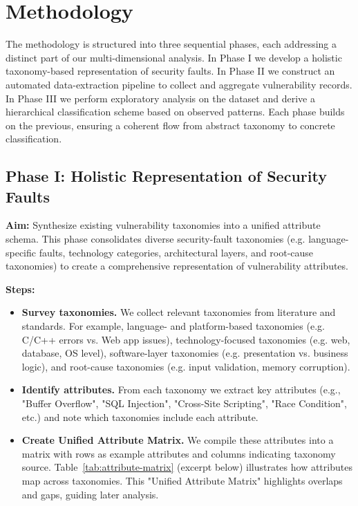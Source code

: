\section{Methodology} The methodology is structured into three sequential phases, each addressing a distinct part of our multi-dimensional analysis. In Phase I we develop a holistic taxonomy-based representation of security faults. In Phase II we construct an automated data-extraction pipeline to collect and aggregate vulnerability records. In Phase III we perform exploratory analysis on the dataset and derive a hierarchical classification scheme based on observed patterns. Each phase builds on the previous, ensuring a coherent flow from abstract taxonomy to concrete classification.

\subsection{Phase I: Holistic Representation of Security Faults} \textbf{Aim:} Synthesize existing vulnerability taxonomies into a unified attribute schema. This phase consolidates diverse security-fault taxonomies (e.g. language-specific faults, technology categories, architectural layers, and root-cause taxonomies) to create a comprehensive representation of vulnerability attributes.
\newline





\textbf{Steps:}

\begin{itemize}
    \item \textbf{Survey taxonomies.} We collect relevant taxonomies from literature and standards. For example, language- and platform-based taxonomies (e.g. C/C++ errors vs. Web app issues), technology-focused taxonomies (e.g. web, database, OS level), software-layer taxonomies (e.g. presentation vs. business logic), and root-cause taxonomies (e.g. input validation, memory corruption).
    \item \textbf{Identify attributes.} From each taxonomy we extract key attributes (e.g., "Buffer Overflow", "SQL Injection", "Cross-Site Scripting", "Race Condition", etc.) and note which taxonomies include each attribute.
    \item \textbf{Create Unified Attribute Matrix.} We compile these attributes into a matrix with rows as example attributes and columns indicating taxonomy source. Table~\ref{tab:attribute-matrix} (excerpt below) illustrates how attributes map across taxonomies. This "Unified Attribute Matrix" highlights overlaps and gaps, guiding later analysis.
\end{itemize}

